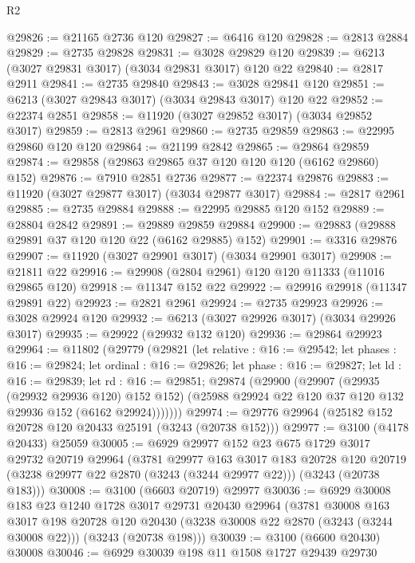 \begin{lexlean}{R2}
\begin{coremodule}
@29826 := @21165 @2736 @120
@29827 := @6416 @120
@29828 := @2813 @2884
@29829 := @2735 @29828
@29831 := @3028 @29829 @120
@29839 := @6213 (@3027 @29831 @3017) (@3034 @29831 @3017) @120 @22
@29840 := @2817 @2911
@29841 := @2735 @29840
@29843 := @3028 @29841 @120
@29851 := @6213 (@3027 @29843 @3017) (@3034 @29843 @3017) @120 @22
@29852 := @22374 @2851
@29858 := @11920 (@3027 @29852 @3017) (@3034 @29852 @3017)
@29859 := @2813 @2961
@29860 := @2735 @29859
@29863 := @22995 @29860 @120 @120
@29864 := @21199 @2842
@29865 := @29864 @29859
@29874 := @29858 (@29863 @29865 @37 @120 @120 @120 (@6162 @29860) @152)
@29876 := @7910 @2851 @2736
@29877 := @22374 @29876
@29883 := @11920 (@3027 @29877 @3017) (@3034 @29877 @3017)
@29884 := @2817 @2961
@29885 := @2735 @29884
@29888 := @22995 @29885 @120 @152
@29889 := @28804 @2842
@29891 := @29889 @29859 @29884
@29900 := @29883 (@29888 @29891 @37 @120 @120 @22 (@6162 @29885) @152)
@29901 := @3316 @29876
@29907 := @11920 (@3027 @29901 @3017) (@3034 @29901 @3017)
@29908 := @21811 @22
@29916 := @29908 (@2804 @2961) @120 @120 @11333 (@11016 @29865 @120)
@29918 := @11347 @152 @22
@29922 := @29916 @29918 (@11347 @29891 @22)
@29923 := @2821 @2961
@29924 := @2735 @29923
@29926 := @3028 @29924 @120
@29932 := @6213 (@3027 @29926 @3017) (@3034 @29926 @3017)
@29935 := @29922 (@29932 @132 @120)
@29936 := @29864 @29923
@29964 := @11802
    (@29779
      (@29821
        (let relative : @16 := @29542;
        let phases : @16 := @29824;
        let ordinal : @16 := @29826;
        let phase : @16 := @29827;
        let ld : @16 := @29839;
        let rd : @16 := @29851;
        @29874
          (@29900
            (@29907
              (@29935 (@29932 @29936 @120) @152 @152)
              (@25988 @29924 @22 @120 @37 @120 @132 @29936 @152 (@6162 @29924)))))))
@29974 := @29776 @29964 (@25182 @152 @20728 @120 @20433 @25191 (@3243 (@20738 @152)))
@29977 := @3100 (@4178 @20433) @25059
@30005 := @6929
    @29977
    @152
    @23
    @675
    @1729
    @3017
    @29732
    @20719
    @29964
    (@3781
      @29977
      @163
      @3017
      @183
      @20728
      @120
      @20719
      (@3238 @29977 @22 @2870 (@3243 (@3244 @29977 @22)))
      (@3243 (@20738 @183)))
@30008 := @3100 (@6603 @20719) @29977
@30036 := @6929
    @30008
    @183
    @23
    @1240
    @1728
    @3017
    @29731
    @20430
    @29964
    (@3781
      @30008
      @163
      @3017
      @198
      @20728
      @120
      @20430
      (@3238 @30008 @22 @2870 (@3243 (@3244 @30008 @22)))
      (@3243 (@20738 @198)))
@30039 := @3100 (@6600 @20430) @30008
@30046 := @6929 @30039 @198 @11 @1508 @1727 @29439 @29730

\end{coremodule}
\end{lexlean}
